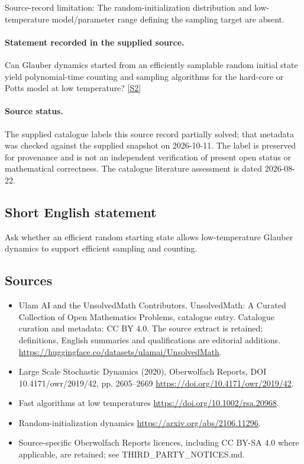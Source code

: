 \documentclass[11pt]{article}
\begin{document}
Source-record limitation: The random-initialization distribution and low-temperature model/parameter range defining the sampling target are absent.
\paragraph{Statement recorded in the supplied source.}
Can Glauber dynamics started from an efficiently samplable random initial state yield polynomial-time counting and sampling algorithms for the hard-core or Potts model at low temperature? \href{https://doi.org/10.4171/owr/2019/42}{[S2]}
\paragraph{Source status.}
The supplied catalogue labels this source record partially solved; that metadata was checked against the supplied snapshot on 2026-10-11. The label is preserved for provenance and is not an independent verification of present open status or mathematical correctness. The catalogue literature assessment is dated 2026-08-22.
\subsection{Short English statement}
Ask whether an efficient random starting state allows low-temperature Glauber dynamics to support efficient sampling and counting.
\subsection{Sources}
\begin{itemize}
\item[S1] Ulam AI and the UnsolvedMath Contributors, UnsolvedMath: A Curated Collection of Open Mathematics Problems, catalogue entry. Catalogue curation and metadata: CC BY 4.0. The source extract is retained; definitions, English summaries and qualifications are editorial additions.
\url{https://huggingface.co/datasets/ulamai/UnsolvedMath}.
\item[S2] Large Scale Stochastic Dynamics (2020), Oberwolfach Reports, DOI 10.4171/owr/2019/42, pp. 2605--2669
\url{https://doi.org/10.4171/owr/2019/42}.
\item[S3] Fast algorithms at low temperatures
\url{https://doi.org/10.1002/rsa.20968}.
\item[S4] Random-initialization dynamics
\url{https://arxiv.org/abs/2106.11296}.
\item Source-specific Oberwolfach Reports licences, including CC BY-SA 4.0 where applicable, are retained; see THIRD\_PARTY\_NOTICES.md.
\end{itemize}
\end{document}

